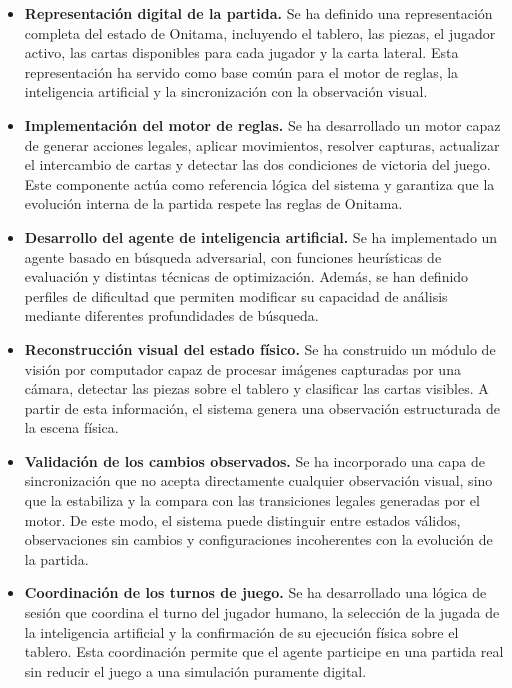 \begin{itemize}
    \item \textbf{Representación digital de la partida.} Se ha definido una representación completa del estado de Onitama, incluyendo el tablero, las piezas, el jugador activo, las cartas disponibles para cada jugador y la carta lateral. Esta representación ha servido como base común para el motor de reglas, la inteligencia artificial y la sincronización con la observación visual.

    \item \textbf{Implementación del motor de reglas.} Se ha desarrollado un motor capaz de generar acciones legales, aplicar movimientos, resolver capturas, actualizar el intercambio de cartas y detectar las dos condiciones de victoria del juego. Este componente actúa como referencia lógica del sistema y garantiza que la evolución interna de la partida respete las reglas de Onitama.

    \item \textbf{Desarrollo del agente de inteligencia artificial.} Se ha implementado un agente basado en búsqueda adversarial, con funciones heurísticas de evaluación y distintas técnicas de optimización. Además, se han definido perfiles de dificultad que permiten modificar su capacidad de análisis mediante diferentes profundidades de búsqueda.

    \item \textbf{Reconstrucción visual del estado físico.} Se ha construido un módulo de visión por computador capaz de procesar imágenes capturadas por una cámara, detectar las piezas sobre el tablero y clasificar las cartas visibles. A partir de esta información, el sistema genera una observación estructurada de la escena física.

    \item \textbf{Validación de los cambios observados.} Se ha incorporado una capa de sincronización que no acepta directamente cualquier observación visual, sino que la estabiliza y la compara con las transiciones legales generadas por el motor. De este modo, el sistema puede distinguir entre estados válidos, observaciones sin cambios y configuraciones incoherentes con la evolución de la partida.

    \item \textbf{Coordinación de los turnos de juego.} Se ha desarrollado una lógica de sesión que coordina el turno del jugador humano, la selección de la jugada de la inteligencia artificial y la confirmación de su ejecución física sobre el tablero. Esta coordinación permite que el agente participe en una partida real sin reducir el juego a una simulación puramente digital.


\end{itemize}
